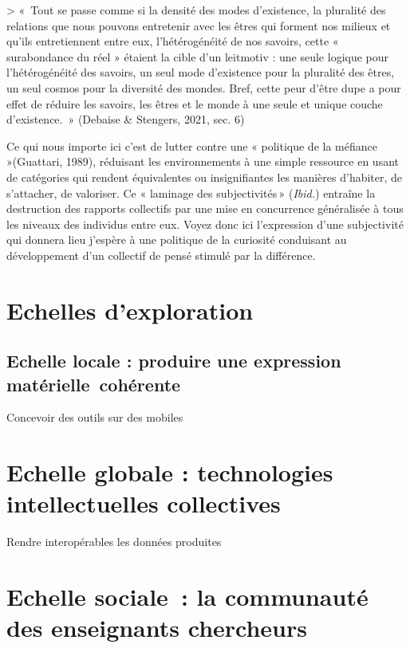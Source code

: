 \documentclass[
  a4paper,
  DIV=11,
  numbers=noendperiod]{scrreprt}
\begin{document}
\textgreater{} «~Tout se passe comme si la densité des modes
d'existence, la pluralité des relations que nous pouvons entretenir avec
les êtres qui forment nos milieux et qu'ils entretiennent entre eux,
l'hétérogénéité de nos savoirs, cette « surabondance du réel » étaient
la cible d'un leitmotiv : une seule logique pour l'hétérogénéité des
savoirs, un seul mode d'existence pour la pluralité des êtres, un seul
cosmos pour la diversité des mondes. Bref, cette peur d'être dupe a pour
effet de réduire les savoirs, les êtres et le monde à une seule et
unique couche d'existence.~» (Debaise \& Stengers, 2021, sec. 6)

Ce qui nous importe ici c'est de lutter contre une « politique de la
méfiance »(Guattari, 1989), réduisant les environnements à une simple
ressource en usant de catégories qui rendent équivalentes ou
insignifiantes les manières d'habiter, de s'attacher, de valoriser. Ce «
laminage des subjectivités\,» (\emph{Ibid.}) entraîne la destruction des
rapports collectifs par une mise en concurrence généralisée à tous les
niveaux des individus entre eux. Voyez donc ici l'expression d'une
subjectivité qui donnera lieu j'espère à une politique de la curiosité
conduisant au développement d'un collectif de pensé stimulé par la
différence.

\section{Echelles d'exploration}\label{sec-echelleExploration}

\subsection{Echelle locale : produire une expression
matérielle~cohérente}\label{sec-echelleLocale}

Concevoir des outils sur des mobiles

\section{Echelle globale : technologies intellectuelles
collectives}\label{sec-echelleGlobale}

Rendre interopérables les données produites

\section{Echelle sociale~: la communauté des enseignants
chercheurs}\label{sec-echelleSociale}
\end{document}
